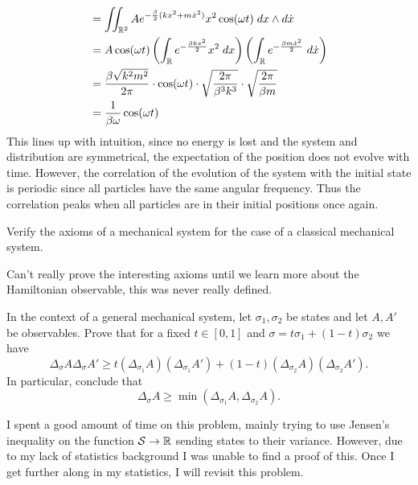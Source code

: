 \documentclass{pset}
\begin{document}
\begin{solution}
\[\begin{aligned}
            &= \iint_{\mathbb{R}^2} Ae^{-\frac{\beta}{2}(kx^2+m\dot{x}^2)} x^2\cos(\omega t)\;dx\wedge d\dot{x}\\
            &= A\cos(\omega t)\left(\int_{\mathbb{R}} e^{-\frac{\beta kx^2}{2}} x^2\;dx\right) \left(\int_{\mathbb{R}} e^{-\frac{\beta m\dot{x}^2}{2}}\;d\dot{x}\right)\\
            &= \frac{\beta\sqrt{k^2m^2}}{2\pi}\cdot\cos(\omega t)\cdot \sqrt{\frac{2\pi}{\beta^3k^3}}\cdot \sqrt{\frac{2\pi}{\beta m}}\\
            &=\frac{1}{\beta \omega}\cos(\omega t)
        \end{aligned}
    \]  
    This lines up with intuition, since no energy is lost and the system and distribution are symmetrical, the expectation of the position does not evolve with time. However, the correlation of the evolution of the system with the initial state is periodic since all particles have the same angular frequency. Thus the correlation peaks when all particles are in their initial positions once again.
\end{solution}

\pagebreak

\begin{problem}
    Verify the axioms of a mechanical system for the case of a classical mechanical system.
\end{problem}

\quad Can't really prove the interesting axioms until we learn more about the Hamiltonian observable, this was never really defined.

\begin{problem}
    In the context of a general mechanical system, let $\sigma_1, \sigma_2$ be states and let $A, A'$ be observables. Prove that for a fixed $t\in [0,1]$ and $\sigma = t\sigma_1 + (1-t)\sigma_2$ we have
    \[
        \Delta_\sigma A \Delta_\sigma A' \geq t(\Delta_{\sigma_1} A)(\Delta_{\sigma_1} A') + (1-t) (\Delta_{\sigma_2} A)(\Delta_{\sigma_2} A')
    .\]
    In particular, conclude that
    \[
        \Delta_\sigma A \geq \min(\Delta_{\sigma_1} A, \Delta_{\sigma_2} A)
    .\] 
\end{problem}

\begin{solution}
    \quad I spent a good amount of time on this problem, mainly trying to use Jensen's inequality on the function $\mathcal{S} \to \mathbb{R}$ sending states to their variance. However, due to my lack of statistics background I was unable to find a proof of this. Once I get further along in my statistics, I will revisit this problem.
\end{solution}
\end{document}
